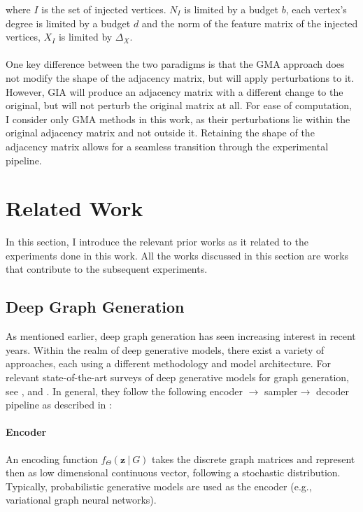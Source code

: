 \documentclass{article}
\begin{document}
where $I$ is the set of injected vertices. $N_I$ is limited by a budget $b$, each vertex's degree is limited by a budget $d$ and the norm of the feature matrix of the injected vertices, $X_I$ is limited by $\Delta_X$.
\\
\\
One key difference between the two paradigms is that the GMA approach does not modify the shape of the adjacency matrix, but will apply perturbations to it. However, GIA will produce an adjacency matrix with a different change to the original, but will not perturb the original matrix at all. For ease of computation, I consider only GMA methods in this work, as their perturbations lie within the original adjacency matrix and not outside it. Retaining the shape of the adjacency matrix allows for a seamless transition through the experimental pipeline.

\section{Related Work}
\label{RelatedWork}

In this section, I introduce the relevant prior works as it related to the experiments done in this work. All the works discussed in this section are works that contribute to the subsequent experiments. 

\subsection{Deep Graph Generation}

As mentioned earlier, deep graph generation has seen increasing interest in recent years. Within the realm of deep generative models, there exist a variety of approaches, each using a different methodology and model architecture. For relevant state-of-the-art surveys of deep generative models for graph generation, see \cite{guo2022survey}, and \cite{zhu2022survey}. In general, they follow the following encoder $\rightarrow$ sampler$\rightarrow$ decoder pipeline as described in \cite{zhu2022survey}: 

\paragraph{Encoder} An encoding function $f_{\Theta}(\mathbf{z}\ |\ G)$ takes the discrete graph matrices and represent then as low dimensional continuous vector, following a stochastic distribution. Typically, probabilistic generative models are used as the encoder (e.g.,  variational graph neural networks).
\end{document}
